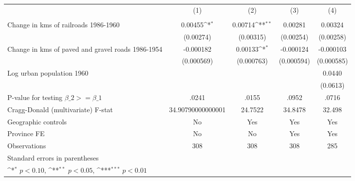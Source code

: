 {
\def\sym#1{\ifmmode^{#1}\else\(^{#1}\)\fi}
\begin{tabular}{l*{4}{c}}
\hline\hline
                &\multicolumn{1}{c}{(1)}&\multicolumn{1}{c}{(2)}&\multicolumn{1}{c}{(3)}&\multicolumn{1}{c}{(4)}\\
                &\multicolumn{1}{c}{}&\multicolumn{1}{c}{}&\multicolumn{1}{c}{}&\multicolumn{1}{c}{}\\
\hline
Change in kms of railroads 1986-1960&  0.00455\sym{*}  &  0.00714\sym{**} &  0.00281         &  0.00324         \\
                &(0.00274)         &(0.00315)         &(0.00254)         &(0.00258)         \\
[1em]
Change in kms of paved and gravel roads 1986-1954&-0.000182         &  0.00133\sym{*}  &-0.000124         &-0.000103         \\
                &(0.000569)         &(0.000763)         &(0.000594)         &(0.000585)         \\
[1em]
Log urban population 1960&                  &                  &                  &   0.0440         \\
                &                  &                  &                  & (0.0613)         \\
\hline
P-value for testing $\beta\_{2} >= \beta\_{1}$&    .0241         &    .0155         &    .0952         &    .0716         \\
Cragg-Donald (multivariate) F-stat&34.90790000000001         &  24.7522         &  34.8478         &   32.498         \\
Geographic controls&       No         &      Yes         &      Yes         &      Yes         \\
Province FE     &       No         &       No         &      Yes         &      Yes         \\
Observations    &      308         &      308         &      308         &      285         \\
\hline\hline
\multicolumn{5}{l}{\footnotesize Standard errors in parentheses}\\
\multicolumn{5}{l}{\footnotesize \sym{*} \(p<0.10\), \sym{**} \(p<0.05\), \sym{***} \(p<0.01\)}\\
\end{tabular}
}
